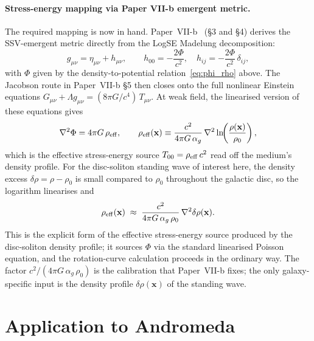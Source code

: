\documentclass[11pt,a4paper]{article}
\begin{document}
\paragraph{Stress-energy mapping via Paper VII-b emergent metric.}
\label{para:stress-energy}
The required mapping is now in hand.  Paper~VII-b~\cite{SSV-VIIb} (\S3 and
\S4) derives the SSV-emergent metric directly from the LogSE Madelung
decomposition:
\begin{equation}
  g_{\mu\nu} = \eta_{\mu\nu} + h_{\mu\nu},
  \qquad
  h_{00} = -\frac{2\Phi}{c^2},\quad
  h_{ij} = -\frac{2\Phi}{c^2}\,\delta_{ij},
  \label{eq:VIIb-metric-import}
\end{equation}
with $\Phi$ given by the density-to-potential relation~\eqref{eq:phi_rho}
above.  The Jacobson route in Paper~VII-b \S5 then closes onto the full
nonlinear Einstein equations
$G_{\mu\nu}+\Lambda g_{\mu\nu} = (8\pi G/c^4)\,T_{\mu\nu}$.  At weak field,
the linearised version of these equations gives
\begin{equation}
  \nabla^2\Phi = 4\pi G\,\rho_{\rm eff},
  \qquad
  \rho_{\rm eff}(\mathbf x) \equiv \frac{c^2}{4\pi G\,\alpha_g}\,
    \nabla^2\ln\!\!\left(\frac{\rho(\mathbf x)}{\rho_0}\right),
  \label{eq:rho-eff}
\end{equation}
which is the effective stress-energy source $T_{00}=\rho_{\rm eff}\,c^2$
read off the medium's density profile.  For the disc-soliton standing wave
of interest here, the density excess $\delta\rho=\rho-\rho_0$ is small
compared to $\rho_0$ throughout the galactic disc, so the logarithm
linearises and
\begin{equation}
  \rho_{\rm eff}(\mathbf x)
    \;\approx\;
    \frac{c^2}{4\pi G\,\alpha_g\,\rho_0}\,\nabla^2\delta\rho(\mathbf x).
  \label{eq:rho-eff-linear}
\end{equation}
This is the explicit form of the effective stress-energy source produced by
the disc-soliton density profile; it sources $\Phi$ via the standard
linearised Poisson equation, and the rotation-curve calculation proceeds in
the ordinary way.  The factor $c^2/(4\pi G\,\alpha_g\,\rho_0)$ is the
calibration that Paper~VII-b fixes; the only galaxy-specific input is the
density profile $\delta\rho(\mathbf x)$ of the standing wave.

\section{Application to Andromeda}
\label{sec:andromeda}
\end{document}
